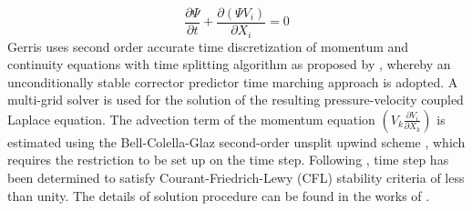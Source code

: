 \documentclass{jfm}
\begin{document}
\begin{equation} \label{Equation::vof}
\frac{\partial \Psi}{\partial t} + \frac{\partial(\Psi V_i)}{\partial X_i} = 0
\end{equation}
Gerris uses second order accurate time discretization of momentum and continuity equations with time splitting algorithm as proposed by \cite{Chorin1968}, whereby an unconditionally stable corrector predictor time marching approach is adopted. A multi-grid solver is used for the solution of the resulting pressure-velocity coupled Laplace equation. The advection term of the momentum equation $\left(V_k\frac{\partial V_i}{\partial X_k}\right)$ is estimated using the Bell-Colella-Glaz second-order unsplit upwind scheme \citep{bell1989second}, which requires the restriction to be set up on the time step. Following \cite{popinet2009}, time step has been determined to satisfy Courant-Friedrich-Lewy (CFL) stability criteria of less than unity. The details of solution procedure can be found in the works of \cite{Popinet2003,popinet2009}.\\
\end{document}
